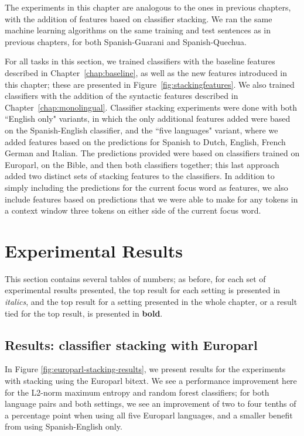 The experiments in this chapter are analogous to the ones in previous chapters,
with the addition of features based on classifier stacking. We ran the same
machine learning algorithms on the same training and test sentences as in
previous chapters, for both Spanish-Guarani and Spanish-Quechua.

For all tasks in this section, we trained classifiers with the baseline
features described in Chapter~\ref{chap:baseline}, as well as the new features
introduced in this chapter; these are presented in
Figure~\ref{fig:stackingfeatures}.  We also trained classifiers with the
addition of the syntactic features described in Chapter~\ref{chap:monolingual}.
Classifier stacking experiments were done with both ``English only" variants,
in which the only additional features added were based on the Spanish-English
classifier, and the ``five languages" variant, where we added features based on
the predictions for Spanish to Dutch, English, French German and Italian. The
predictions provided were based on classifiers trained on Europarl, on the
Bible, and then both classifiers together; this last approach added two
distinct sets of stacking features to the classifiers.  In addition to simply
including the predictions for the current focus word as features, we also
include features based on predictions that we were able to make for any tokens
in a context window three tokens on either side of the current focus word.

\section{Experimental Results}
\label{sec:multilingual-results}

This section contains several tables of numbers; as before, for each set of
experimental results presented, the top result for each setting is presented in
\emph{italics}, and the top result for a setting presented in the whole
chapter, or a result tied for the top result, is presented in \textbf{bold}.

\subsection{Results: classifier stacking with Europarl}

In Figure \ref{fig:europarl-stacking-results}, we present results for the
experiments with stacking using the Europarl bitext. We see a performance
improvement here for the L2-norm maximum entropy and random forest classifiers;
for both language pairs and both settings, we see an improvement of two to four
tenths of a percentage point when using all five Europarl languages, and a
smaller benefit from using Spanish-English only.


